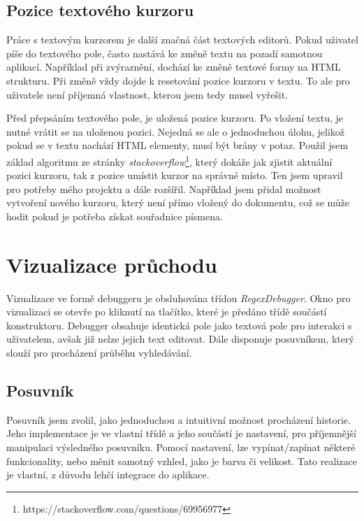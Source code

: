 \subsection*{Pozice textového kurzoru}
Práce s textovým kurzorem je další značná část textových editorů.
Pokud uživatel píše do textového pole, často nastává ke změně textu na pozadí samotnou aplikací.
Například při zvýraznění, dochází ke změně textové formy na HTML strukturu.
Při změně vždy dojde k resetování pozice kurzoru v textu.
To ale pro uživatele není příjemná vlastnost, kterou jsem tedy musel vyřešit.

Před přepsáním textového pole, je uložená pozice kurzoru.
Po vložení textu, je nutné vrátit se na uloženou pozici. 
Nejedná se ale o jednoduchou úlohu, jelikož pokud se v textu nachází HTML elementy, musí být brány v potaz.
Použil jsem základ algoritmu ze stránky \textit{stackoverflow}\footnote{https://stackoverflow.com/questions/69956977}, který dokáže jak zjistit aktuální pozici kurzoru, tak z pozice umístit kurzor na správné místo.
Ten jsem upravil pro potřeby mého projektu a dále rozšířil.
Například jsem přidal možnost vytvoření nového kurzoru, který není přímo vložený do dokumentu, což se může hodit pokud je potřeba získat souřadnice písmena.

\section{Vizualizace průchodu}

Vizualizace ve formě debuggeru je obsluhována třídou \textit{RegexDebugger}.
Okno pro vizualizaci se otevře po kliknutí na tlačítko, které je předáno třídě součástí konstruktoru.
Debugger obsahuje identická pole jako textová pole pro interakci s uživatelem, avšak již nelze jejich text editovat.
Dále disponuje posuvníkem, který slouží pro procházení průběhu vyhledávání. 

\subsection*{Posuvník}

Posuvník jsem zvolil, jako jednoduchou a intuitivní možnost procházení historie.
Jeho implementace je ve vlastní třídě a jeho součástí je nastavení, pro příjemnější manipulaci výsledného posuvníku.
Pomocí nastavení, lze vypínat/zapínat některé funkcionality, nebo měnit samotný vzhled, jako je barva či velikost.
Tato realizace je vlastní, z důvodu lehčí integrace do aplikace.

